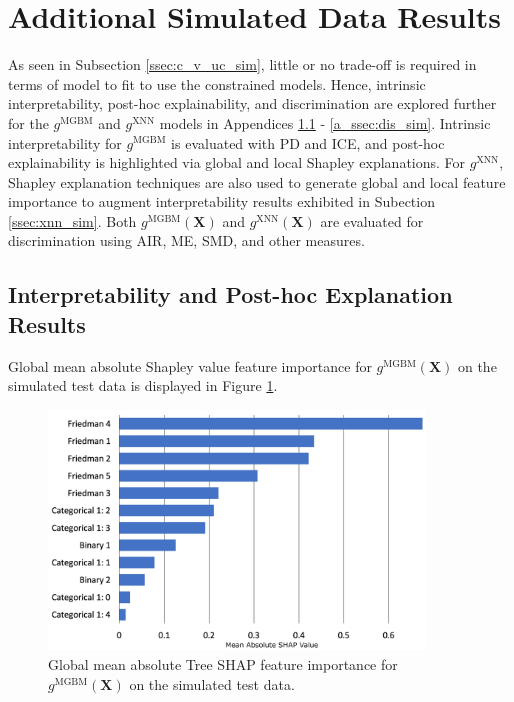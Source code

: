 \documentclass[information,article,submit,moreauthors,pdftex]{definitions/mdpi}
\begin{document}
\section{Additional Simulated Data Results}\label{a_sec:res_sim}

As seen in Subsection \ref{ssec:c_v_uc_sim}, little or no trade-off is required in terms of model to fit to use the constrained models. Hence, intrinsic interpretability, post-hoc explainability, and discrimination are explored further for the $g^\text{MGBM}$ and $g^\text{XNN}$ models in Appendices \ref{a_ssec:int_ex_sim} - \ref{a_ssec:dis_sim}. Intrinsic interpretability for $g^\text{MGBM}$ is evaluated with PD and ICE, and post-hoc explainability is highlighted via global and local Shapley explanations. For $g^\text{XNN}$, Shapley explanation techniques are also used to generate global and local feature importance to augment interpretability results exhibited in Subection \ref{ssec:xnn_sim}. Both $g^\text{MGBM}(\mathbf{X})$ and $g^\text{XNN}(\mathbf{X})$ are evaluated for discrimination using AIR, ME, SMD, and other measures.

\subsection{Interpretability and Post-hoc Explanation Results}\label{a_ssec:int_ex_sim}

Global mean absolute Shapley value feature importance for $g^{\text{MGBM}}(\mathbf{X})$ on the simulated test data is displayed in Figure \ref{fig:sim_mgbm_glob}. 

\begin{figure}[htb]
	\captionsetup{width=16cm}
	\centering
	\includegraphics[width=10cm]{img/sim_mgbm_glob.png}
	\caption{Global mean absolute Tree SHAP feature importance for $g^\text{MGBM}(\mathbf{X})$ on the simulated test data.}
	\label{fig:sim_mgbm_glob}
\end{figure}  
\end{document}
